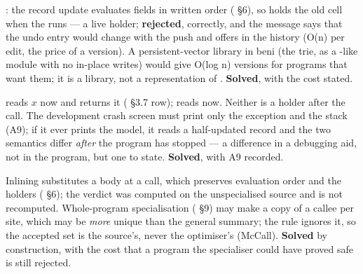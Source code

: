 
: the record update evaluates fields in written order ( §6), so  holds the old cell when the  runs — a live holder; \textbf{rejected}, correctly, and the message says that the undo entry would change with the push and offers  in the history (O(n) per edit, the price of a version). A persistent-vector library in beni (the trie, as a -like module with no in-place writes) would give O(log n) versions for programs that want them; it is a library, not a representation of . \textbf{Solved}, with the cost stated.


 reads $x$ now and returns it ( §3.7 row);  reads now. Neither is a holder after the call. The development crash screen must print only the exception and the stack (A9); if it ever prints the model, it reads a half-updated record and the two semantics differ \emph{after} the program has stopped — a difference in a debugging aid, not in the program, but one to state. \textbf{Solved}, with A9 recorded.


Inlining substitutes a body at a call, which preserves evaluation order and the holders ( §6); the verdict was computed on the unspecialised source and is not recomputed. Whole-program specialisation ( §9) may make a copy of a callee per site, which may be \emph{more} unique than the general summary; the rule ignores it, so the accepted set is the source's, never the optimiser's (McCall). \textbf{Solved} by construction, with the cost that a program the specialiser could have proved safe is still rejected.
